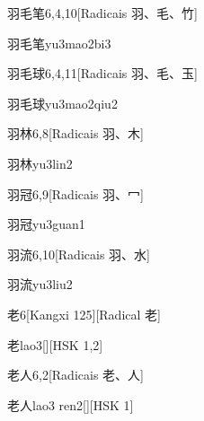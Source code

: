 \begin{entry}{羽毛笔}{6,4,10}[Radicais ⽻、⽑、⽵]
  \begin{phonetics}{羽毛笔}{yu3mao2bi3}
  \end{phonetics}
\end{entry}

\begin{entry}{羽毛球}{6,4,11}[Radicais ⽻、⽑、⽟]
  \begin{phonetics}{羽毛球}{yu3mao2qiu2}
  \end{phonetics}
\end{entry}

\begin{entry}{羽林}{6,8}[Radicais ⽻、⽊]
  \begin{phonetics}{羽林}{yu3lin2}
  \end{phonetics}
\end{entry}

\begin{entry}{羽冠}{6,9}[Radicais ⽻、⼍]
  \begin{phonetics}{羽冠}{yu3guan1}
  \end{phonetics}
\end{entry}

\begin{entry}{羽流}{6,10}[Radicais ⽻、⽔]
  \begin{phonetics}{羽流}{yu3liu2}
  \end{phonetics}
\end{entry}

\begin{entry}{老}{6}[Kangxi 125][Radical ⽼]
  \begin{phonetics}{老}{lao3}[][HSK 1,2]
  \end{phonetics}
\end{entry}

\begin{entry}{老人}{6,2}[Radicais ⽼、⼈]
  \begin{phonetics}{老人}{lao3 ren2}[][HSK 1]
  \end{phonetics}
\end{entry}

